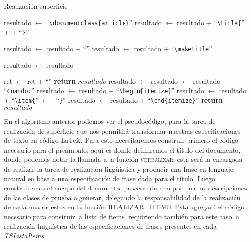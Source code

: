 \begin{algorithm}
  \caption{Realización superficie}\label{alg:realization}
  \begin{algorithmic}[1]
  
  \State resultado $\gets$ ``\verb|\documentclass{article}|''
  \State resultado $\gets$ resultado + ``\verb|\title{|'' +  + ``\verb|}|''
  
  \State resultado $\gets$ resultado + ``\verb||''
  \State resultado $\gets$ resultado + ``\verb|\maketitle|''
  
    \State resultado $\gets$ resultado +   
  \EndFor

  \State ret $\gets$ ret + ``\verb||''
  \State \textbf{return} $resultado$
  \EndFunction
  \Statex
    \State resultado $\gets$  
	\State resultado $\gets$ resultado + ``\verb|Cuando:|''
    \State resultado $\gets$ resultado + ``\verb|\begin{itemize}|''
      \State resultado $\gets$ resultado + ``\verb|\item{|'' +  + ``\verb|}|'' 
    \EndFor  
    \State resultado $\gets$ resultado + ``\verb|\end{itemize}|''
    \State \textbf{return} $resultado$
  \EndFunction
\end{algorithmic}
\end{algorithm}

En el algoritmo anterior podemos ver el pseudocódigo, para la tarea de realización de superficie que nos permitirá transformar nuestras especificaciones de texto en código \LaTeX. Para esto necesitaremos construir primero el código necesario para el preámbulo, aquí es donde definiremos el título del documento, donde podemos notar la llamada a la función \textsc{verbalizar}; esta será la encargada de realizar la tarea de realización lingüística y producir una frase en lenguaje natural en base a una especificación de frase dada para el título. Luego construiremos el cuerpo del documento, procesando una por una las descripciones de las clases de prueba a generar, delegando la responsabilidad de la realización de cada una de estas en la función \textsc{REALIZAR\_ITEMS}. Esta agregará el código necesario para construir la lista de ítems, requiriendo también para este caso la realización lingüística de las especificaciones de frases presentes en cada \emph{TSListaItems}.

